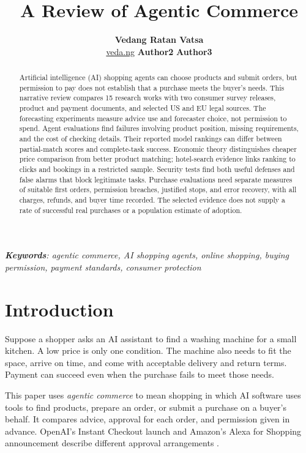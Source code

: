\documentclass{article}
\title{A Review of Agentic Commerce}
\author{\textbf{Vedang Ratan Vatsa} \\ \href{https://veda.ng}{veda.ng} \And \textbf{Author2} \And \textbf{Author3}}
\begin{document}
\raggedbottom
\maketitle
\begin{abstract}
Artificial intelligence (AI) shopping agents can choose products and submit orders, but permission to pay does not establish that a purchase meets the buyer's needs. This narrative review compares 15 research works with two consumer survey releases, product and payment documents, and selected US and EU legal sources. The forecasting experiments measure advice use and forecaster choice, not permission to spend. Agent evaluations find failures involving product position, missing requirements, and the cost of checking details. Their reported model rankings can differ between partial-match scores and complete-task success. Economic theory distinguishes cheaper price comparison from better product matching; hotel-search evidence links ranking to clicks and bookings in a restricted sample. Security tests find both useful defenses and false alarms that block legitimate tasks. Purchase evaluations need separate measures of suitable first orders, permission breaches, justified stops, and error recovery, with all charges, refunds, and buyer time recorded. The selected evidence does not supply a rate of successful real purchases or a population estimate of adoption.
\end{abstract}
\noindent\textit{\textbf{Keywords}: agentic commerce, AI shopping agents, online shopping, buying permission, payment standards, consumer protection}

\section{Introduction}

Suppose a shopper asks an AI assistant to find a washing machine for a small kitchen. A low price is only one condition. The machine also needs to fit the space, arrive on time, and come with acceptable delivery and return terms. Payment can succeed even when the purchase fails to meet those needs.

This paper uses \textit{agentic commerce} to mean shopping in which AI software uses tools to find products, prepare an order, or submit a purchase on a buyer's behalf. It compares advice, approval for each order, and permission given in advance. OpenAI's Instant Checkout launch and Amazon's Alexa for Shopping announcement describe different approval arrangements \cite{ref1,ref4}.
\end{document}
